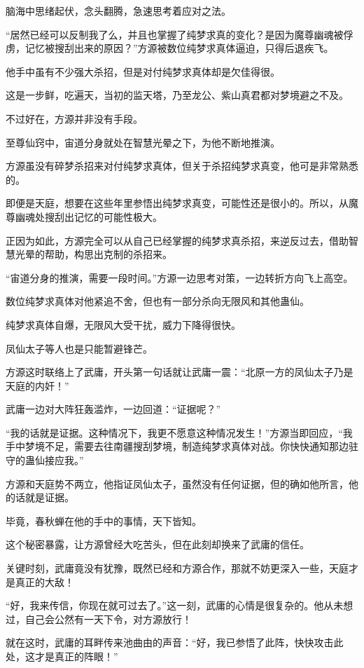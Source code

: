 \begin{this_body}
脑海中思绪起伏，念头翻腾，急速思考着应对之法。

“居然已经可以反制我了么，并且也掌握了纯梦求真的变化？是因为魔尊幽魂被俘虏，记忆被搜刮出来的原因？”方源被数位纯梦求真体逼迫，只得后退疾飞。

他手中虽有不少强大杀招，但是对付纯梦求真体却是欠佳得很。

这是一步鲜，吃遍天，当初的监天塔，乃至龙公、紫山真君都对梦境避之不及。

不过好在，方源并非没有手段。

至尊仙窍中，宙道分身就处在智慧光晕之下，为他不断地推演。

方源虽没有碎梦杀招来对付纯梦求真体，但关于杀招纯梦求真变，他可是非常熟悉的。

即便是天庭，想要在这些年里参悟出纯梦求真变，可能性还是很小的。所以，从魔尊幽魂处搜刮出记忆的可能性极大。

正因为如此，方源完全可以从自己已经掌握的纯梦求真杀招，来逆反过去，借助智慧光晕的帮助，构思出克制的杀招来。

“宙道分身的推演，需要一段时间。”方源一边思考对策，一边转折方向飞上高空。

数位纯梦求真体对他紧追不舍，但也有一部分杀向无限风和其他蛊仙。

纯梦求真体自爆，无限风大受干扰，威力下降得很快。

凤仙太子等人也是只能暂避锋芒。

方源这时联络上了武庸，开头第一句话就让武庸一震：“北原一方的凤仙太子乃是天庭的内奸！”

武庸一边对大阵狂轰滥炸，一边回道：“证据呢？”

“我的话就是证据。这种情况下，我更不愿意这种情况发生！”方源当即回应，“我手中梦境不足，需要去往南疆搜刮梦境，制造纯梦求真体对战。你快快通知那边驻守的蛊仙接应我。”

方源和天庭势不两立，他指证凤仙太子，虽然没有任何证据，但的确如他所言，他的话就是证据。

毕竟，春秋蝉在他的手中的事情，天下皆知。

这个秘密暴露，让方源曾经大吃苦头，但在此刻却换来了武庸的信任。

关键时刻，武庸竟没有犹豫，既然已经和方源合作，那就不妨更深入一些，天庭才是真正的大敌！

“好，我来传信，你现在就可过去了。”这一刻，武庸的心情是很复杂的。他从未想过，自己会公然有一天下令，对方源放行！

就在这时，武庸的耳畔传来池曲由的声音：“好，我已参悟了此阵，快快攻击此处，这才是真正的阵眼！”


\end{this_body}
